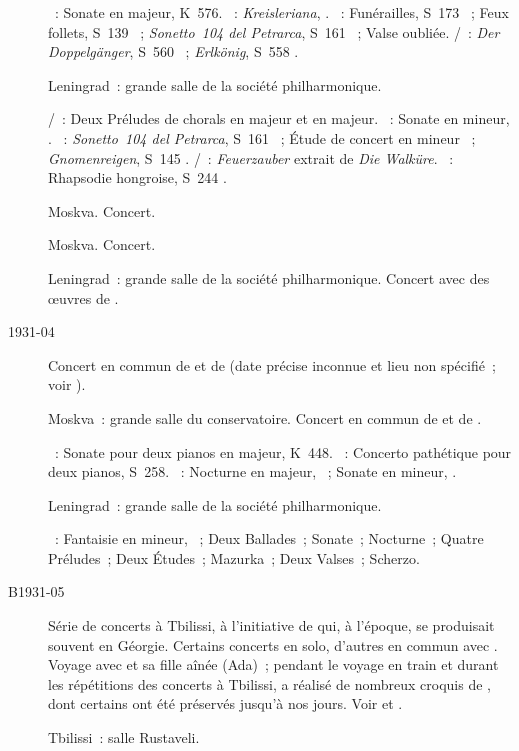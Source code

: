 \begin{description}
 \textsc{\Mozart{}}~: Sonate en \kD majeur, K~576.
 \textsc{\Schumann{}}~: \emph{Kreisleriana}, .
 \textsc{\Liszt{}}~: Funérailles, S~173 ~; Feux follets, S~139
 ~; \emph{Sonetto~104 del Petrarca}, S~161 ~; Valse
 oubliée.
 \textsc{\Schubert{}/\Liszt{}}~: \emph{Der Doppelgänger}, S~560
 ~; \emph{Erlkönig}, S~558 .
 \item[\DateWithWeekDay{1931-04-06}]
 Leningrad~: grande salle de la société philharmonique.

 \textsc{\JBach{}/\Busoni{}}~: Deux Préludes de chorals en \kC majeur et en
 \kG majeur.
 \textsc{\Beethoven{}}~: Sonate en \kC mineur, .
 \textsc{\Liszt{}}~: \emph{Sonetto~104 del Petrarca}, S~161 ~;
 Étude de concert en \kF mineur ~; \emph{Gnomenreigen}, S~145
 .
 \textsc{\Wagner{}/\Brassin{}}~: \emph{Feuerzauber} extrait de \emph{Die
 Walküre}.
 \textsc{\Liszt{}}~: Rhapsodie hongroise, S~244 .
 \item[\DateWithWeekDay{1931-04-14}]
 Moskva.
 Concert.
 \item[\DateWithWeekDay{1931-04-18}]
 Moskva.
 Concert.
 \item[\DateWithWeekDay{1931-04-21}]
 Leningrad~: grande salle de la société philharmonique.
 Concert avec des œuvres de \Chopin{}.
 \item[1931-04]
 Concert en commun de \VSofronitsky{} et de \MYudina{} (date précise
 inconnue et lieu non spécifié~; voir \citet[p.~403]{Scriabine}).
 \item[\DateWithWeekDay{1931-05-02}]
 Moskva~: grande salle du conservatoire.
 Concert en commun de \VSofronitsky{} et de \HNeuhaus{}.

 \textsc{\Mozart{}}~: Sonate pour deux pianos en \kD majeur, K~448.
 \textsc{\Liszt{}}~: Concerto pathétique pour deux pianos, S~258.
 \textsc{\Chopin{}}~: Nocturne en \kD \Flat majeur,  ~;
 Sonate en \kB \Flat mineur, .
 \item[\DateWithWeekDay{1931-05-03}]
 Leningrad~: grande salle de la société philharmonique.

 \textsc{\Chopin{}}~: Fantaisie en \kF mineur, ~; Deux Ballades~;
 Sonate~; Nocturne~; Quatre Préludes~; Deux Études~; Mazurka~; Deux Valses~;
 Scherzo.
 \item[B1931-05]
 Série de concerts à Tbilissi, à l'initiative de \MYudina{} qui, à l'époque,
 se produisait souvent en Géorgie.
 Certains concerts en solo, d'autres en commun avec \MYudina{}.
 Voyage avec \EVizel{} et sa fille aînée \AVizel{} (Ada)~; pendant le voyage
 en train et durant les répétitions des concerts à Tbilissi, \EVizel{} a
 réalisé de nombreux croquis  de \VSofronitsky{}, dont
 certains ont été préservés jusqu'à nos jours.
 Voir \citet[p.~152 et~153]{Nekrasova08} et \citet[p.~427]{Milshteyn82a}.
 \item[\DateWithWeekDay{1931-05-14}]
 Tbilissi~: salle Rustaveli.


\end{description}
